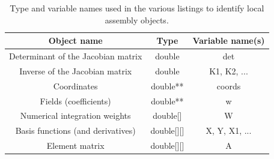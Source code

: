 \begin{table}
\scriptsize
\begin{center}
\begin{tabulary}{1.0\columnwidth}{C|C|C}
\hline
Object name & Type & Variable name(s) \\\hline
Determinant of the Jacobian matrix & double & det  \\
Inverse of the Jacobian matrix & double & K1, K2, ... \\
Coordinates & double** & coords\\
Fields (coefficients) & double** & w \\
Numerical integration weights & double[] & W \\
Basis functions (and derivatives) & double[][] & X, Y, X1, ... \\
Element matrix & double[][] & A\\ \hline
\end{tabulary}
\end{center}
\caption{Type and variable names used in the various listings to identify local assembly objects.}
\label{table:map-name-letters}
\end{table}


